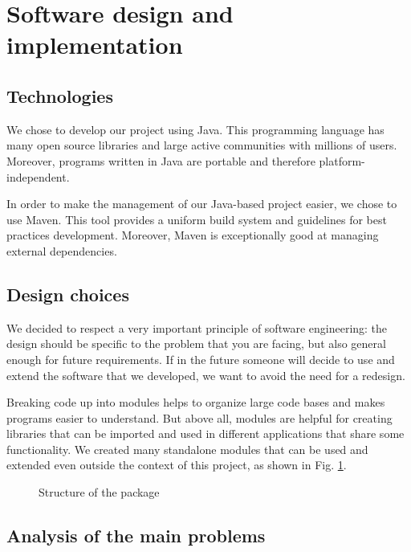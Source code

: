 \section{Software design and implementation}
    \subsection{Technologies}
        We chose to develop our project using Java. This programming language has many open source libraries and large active communities with millions of users. Moreover, programs written in Java are portable and therefore platform-independent.\par

        In order to make the management of our Java-based project easier, we chose to use Maven\footnotemark{}. This tool provides a uniform build system and guidelines for best practices development. Moreover, Maven is exceptionally good at managing external dependencies.\par

    \subsection{Design choices}
        We decided to respect a very important principle of software engineering: the design should be specific to the problem that you are facing, but also general enough for future requirements. If in the future someone will decide to use and extend the software that we developed, we want to avoid the need for a redesign.\par
        Breaking code up into modules helps to organize large code bases and makes programs easier to understand. But above all, modules are helpful for creating libraries that can be imported and used in different applications that share some functionality. We created many standalone modules that can be used and extended even outside the context of this project, as shown in Fig. \ref{stemby-package}.\par
        \begin{figure}
			\centering
			
            \caption{Structure of the package }
			\label{stemby-package}
		\end{figure}
    \subsection{Analysis of the main problems}